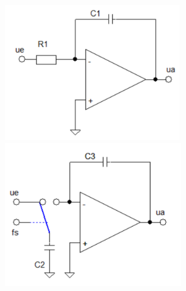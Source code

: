 \documentclass[a4paper]{article}
\begin{document}
\begin{multicols}{3}
\begin{itemize*}
  \end{itemize*}
  \begin{center}
    \includegraphics[width=.3\linewidth]{Assets/Biosignalverarbeitung-diskreter-integrator-mit-ov.png}
    \includegraphics[width=.3\linewidth]{Assets/Biosignalverarbeitung-integrierter-integrator-mit-sc.png}
  \end{center}


\end{multicols}
\end{document}
